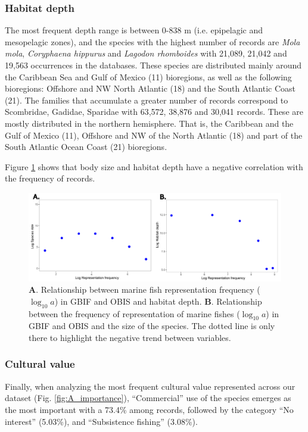 \documentclass[12pt,authoryear]{elsarticle}
\providecommand{\DIFaddbeginFL}{} %
\providecommand{\DIFaddendFL}{} %
\providecommand{\DIFdelbeginFL}{} %
\providecommand{\DIFdelendFL}{} %
\begin{document}
\subsubsection{Habitat depth}
The most frequent depth range is between 0-838 m (i.e. epipelagic and mesopelagic zones), and the species with the highest number of records are \textit{Mola mola}, \textit{Coryphaena hippurus} and \textit{Lagodon rhomboides} with 21,089, 21,042 and 19,563 occurrences in the databases. These species are distributed mainly around the Caribbean Sea and Gulf of Mexico (11) bioregions, as well as the following bioregions: Offshore and NW North Atlantic (18) and the South Atlantic Coast (21). The families that accumulate a greater number of records correspond to Scombridae, Gadidae, Sparidae with 63,572, 38,876 and 30,041 records. These are mostly distributed in the northern hemisphere. That is, the Caribbean and the Gulf of Mexico (11), Offshore and NW of the North Atlantic (18) and part of the South Atlantic Ocean Coast (21) bioregions.

Figure \ref{fig:A_depth_size} shows that body size and habitat depth have a negative correlation with the frequency of records. 

\begin{figure}[h]
  \centering
  \DIFdelbeginFL %
\DIFdelendFL \DIFaddbeginFL \includegraphics[width=\textwidth]{Fig_5}
  \DIFaddendFL \caption{\textbf{A}. Relationship between marine fish representation frequency ($\log_{10} a$) in GBIF and OBIS and habitat depth. \textbf{B}. Relationship between the frequency of representation of marine fishes ($\log_{10} a$) in GBIF and OBIS and the size of the species. The dotted line is only there to highlight the negative trend between variables.}
  \label{fig:A_depth_size}
\end{figure}

\subsubsection{Cultural value}
Finally, when analyzing the most frequent cultural value represented across our dataset (Fig. \ref{fig:A_importance}), ``Commercial'' use of the species emerges as the most important with a 73.4\% among records, followed by the category ``No interest'' (5.03\%), and ``Subsistence fishing'' (3.08\%). 
\end{document}
